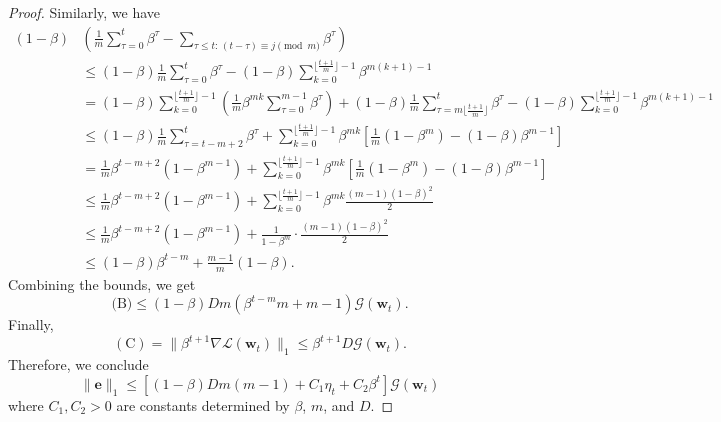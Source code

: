 \documentclass{article} %
\theoremstyle{plain}
\theoremstyle{definition}
\theoremstyle{remark}
\def\gG{{\mathcal{G}}}
\newcommand{\Ls}{\mathcal{L}}
\def\be{{\mathbf e}}
\def\bw{{\mathbf w}}
\begin{document}
\begin{proof}
    Similarly, we have
    \begin{align*}
        (1-\beta) & \left(\frac 1m \sum_{\tau=0}^t \beta^\tau - \sum_{\tau\leq t:\, (t-\tau)\equiv j \pmod m}\beta^\tau \right) \\
        &\leq  (1-\beta) \frac 1m \sum_{\tau=0}^t \beta^\tau - (1-\beta) \sum_{k=0}^{\lfloor \tfrac{t+1}{m} \rfloor -1} \beta^{m(k+1)-1} \\
        &= (1-\beta) \sum_{k=0}^{\lfloor \tfrac{t+1}{m} \rfloor -1} \left( \frac 1m \beta^{mk} \sum_{\tau=0}^{m-1} \beta^\tau  \right) + (1-\beta) \frac 1m \sum_{\tau = m\lfloor \tfrac{t+1}{m} \rfloor}^t \beta^\tau - (1-\beta) \sum_{k=0}^{\lfloor \tfrac{t+1}{m} \rfloor -1} \beta^{m(k+1)-1} \\
        & \leq  (1-\beta) \frac 1m \sum_{\tau = t-m+2}^t \beta^\tau +  \sum_{k=0}^{\lfloor \tfrac{t+1}{m} \rfloor -1} \beta^{mk} \left[\frac 1m (1-\beta^m) - (1-\beta) \beta^{m-1} \right] \\
        &=  \frac{1}{m}\beta^{t-m+2}(1-\beta^{m-1}) +  \sum_{k=0}^{\lfloor \tfrac{t+1}{m} \rfloor -1} \beta^{mk} \left[\frac 1m (1-\beta^m) - (1-\beta) \beta^{m-1} \right] \\
        &\leq \frac{1}{m}\beta^{t-m+2}(1-\beta^{m-1}) + \sum_{k=0}^{\lfloor \tfrac{t+1}{m} \rfloor -1} \beta^{mk} \frac{(m-1)(1-\beta)^2}{2} \\
        &\leq \frac{1}{m}\beta^{t-m+2}(1-\beta^{m-1}) + \frac{1}{1-\beta^m} \cdot \frac{(m-1)(1-\beta)^2}{2}  \\
        &\leq (1-\beta)\beta^{t-m} + \frac{m-1}{m} (1-\beta) .
    \end{align*}
    Combining the bounds, we get
    \[
    \textrm{(B)} \leq (1-\beta) Dm (\beta^{t-m}m+m-1) \gG(\bw_t).
    \]
    Finally,
    \[
    \mathrm{(C)} = \|\beta^{t+1} \nabla \Ls (\bw_t)\|_1 \leq \beta^{t+1} D \gG(\bw_t).
    \]
    Therefore, we conclude
    \[
    \|\be\|_1 \leq  \left[ (1-\beta)Dm(m-1) + C_1\eta_t + C_2 \beta^t \right] \gG(\bw_t)
    \]
    where $C_1, C_2>0$ are constants determined by $\beta$, $m$, and $D$.
\end{proof}
\end{document}
